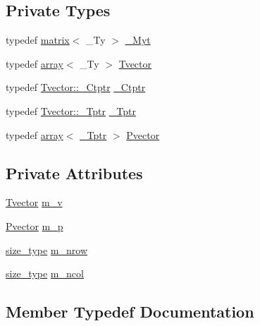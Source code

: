 \subsection*{Private Types}
\begin{DoxyCompactItemize}
\item 
typedef \hyperlink{classupc_1_1matrix}{matrix}$<$ \+\_\+\+Ty $>$ \hyperlink{classupc_1_1matrix_a9e671131fc3af250bb4bad539474da9c}{\+\_\+\+Myt}
\item 
typedef \hyperlink{classupc_1_1array}{array}$<$ \+\_\+\+Ty $>$ \hyperlink{classupc_1_1matrix_acebf527a1d5f301a17e38e08d5cea335}{Tvector}
\item 
typedef \hyperlink{classupc_1_1array_a420718228a4d845721303a19755f0d42}{Tvector\+::\+\_\+\+Ctptr} \hyperlink{classupc_1_1matrix_af4880980335adaf4abe61988558472f5}{\+\_\+\+Ctptr}
\item 
typedef \hyperlink{classupc_1_1array_a4ef66945898a2c393cff5be41de077d2}{Tvector\+::\+\_\+\+Tptr} \hyperlink{classupc_1_1matrix_a75a85786a5de55cdfcdf1f205df1f3e8}{\+\_\+\+Tptr}
\item 
typedef \hyperlink{classupc_1_1array}{array}$<$ \hyperlink{classupc_1_1matrix_a75a85786a5de55cdfcdf1f205df1f3e8}{\+\_\+\+Tptr} $>$ \hyperlink{classupc_1_1matrix_a1f8337796d73b88280f6a517d2d1f20d}{Pvector}
\end{DoxyCompactItemize}
\subsection*{Private Attributes}
\begin{DoxyCompactItemize}
\item 
\hyperlink{classupc_1_1matrix_acebf527a1d5f301a17e38e08d5cea335}{Tvector} \hyperlink{classupc_1_1matrix_a1fd23b090b8e985c526d913792ad0f96}{m\+\_\+v}
\item 
\hyperlink{classupc_1_1matrix_a1f8337796d73b88280f6a517d2d1f20d}{Pvector} \hyperlink{classupc_1_1matrix_a01c5df069e0cddf9efcb5632a7e9c220}{m\+\_\+p}
\item 
\hyperlink{classupc_1_1matrix_a0f2b47f0fc08216f8e0ef1cc1c022663}{size\+\_\+type} \hyperlink{classupc_1_1matrix_a2a32ddd89dd5b9c85d95498f9fb77c70}{m\+\_\+nrow}
\item 
\hyperlink{classupc_1_1matrix_a0f2b47f0fc08216f8e0ef1cc1c022663}{size\+\_\+type} \hyperlink{classupc_1_1matrix_a053950016358b76da92c0a25c01987e9}{m\+\_\+ncol}
\end{DoxyCompactItemize}


\subsection{Member Typedef Documentation}
